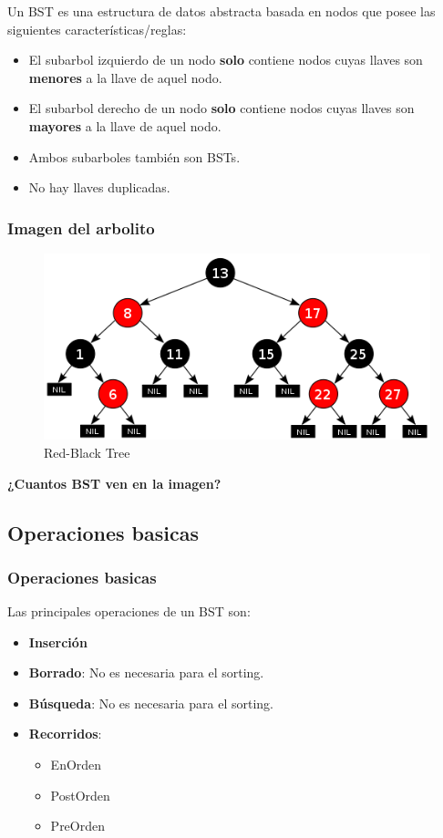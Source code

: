 \documentclass{beamer}
\begin{document}
\begin{frame}
Un BST es una estructura de datos abstracta basada en nodos que posee las siguientes características/reglas:
\begin{itemize}
	\item El subarbol izquierdo de un nodo \textbf{solo} contiene nodos cuyas llaves son \textbf{menores} a la llave de aquel nodo.
	\item El subarbol derecho de un nodo \textbf{solo} contiene nodos cuyas llaves son \textbf{mayores} a la llave de aquel nodo.
	\item Ambos subarboles también son BSTs.
	\item No hay llaves duplicadas.
\end{itemize}
\end{frame}

\begin{frame}
	\frametitle{Imagen del arbolito}
	\begin{figure}
  		\centering
    		\includegraphics[scale=0.5]{rbtree.png}
  		\caption{Red-Black Tree}
  		\label{fig:ejemplo}
	\end{figure}
	\begin{center}
	\textbf{¿Cuantos BST ven en la imagen?}
	\end{center}
\end{frame}



\subsection{Operaciones basicas}



\begin{frame}
\frametitle{Operaciones basicas}
Las principales operaciones de un BST son:
\begin{itemize}
\item \textbf{Inserción}
\item \textbf{Borrado}: No es necesaria para el sorting.
\item \textbf{Búsqueda}: No es necesaria para el sorting.
\item \textbf{Recorridos}:
	\begin{itemize}
		\item EnOrden
		\item PostOrden
		\item PreOrden
	\end{itemize}
\end{itemize}
\end{frame}
\end{document}
